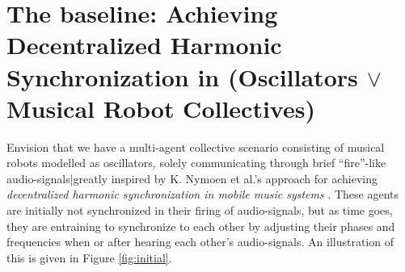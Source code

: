 






\section{The baseline: Achieving Decentralized Harmonic Synchronization in (Oscillators $\vee$ Musical Robot Collectives)}
	\label{sec:baseline}

	Envision that we have a multi-agent collective scenario consisting of musical robots modelled as oscillators, solely communicating through brief ``fire''-like audio-signals|greatly inspired by K. Nymoen et al.'s approach for achieving \textit{decentralized harmonic synchronization in mobile music systems} \cite{nymoen_synch}. These agents are initially not synchronized in their firing of audio-signals, but as time goes, they are entraining to synchronize to each other by adjusting their phases and frequencies when or after hearing each other's audio-signals. An illustration of this is given in Figure \ref{fig:initial}.

